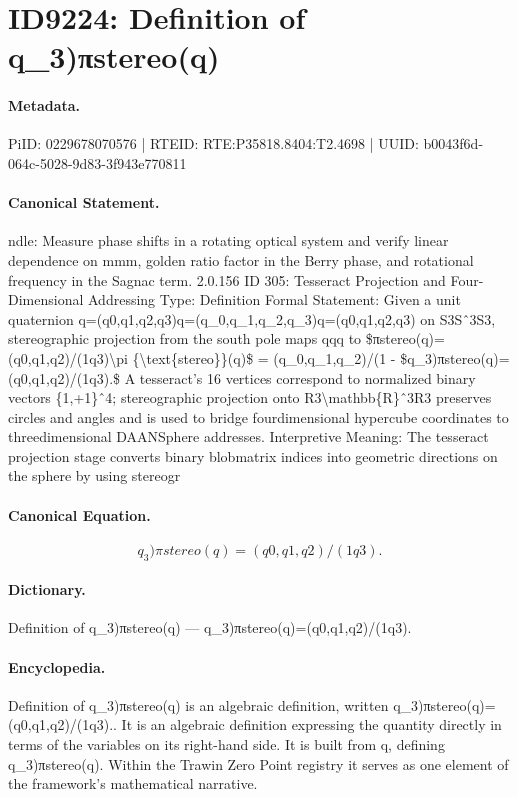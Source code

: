 \section*{ID9224: Definition of q\_3)πstereo(q)}
\paragraph{Metadata.}
PiID: 0229678070576 | RTEID: RTE:P35818.8404:T2.4698 | UUID: b0043f6d-064c-5028-9d83-3f943e770811

\paragraph{Canonical Statement.}
ndle: Measure phase shifts in a rotating optical system and verify linear dependence on mmm, golden ratio factor in the Berry phase, and rotational frequency in the Sagnac term. 2.0.156 ID 305: Tesseract Projection and Four-Dimensional Addressing Type: Definition Formal Statement: Given a unit quaternion q=(q0,q1,q2,q3)q=(q\_0,q\_1,q\_2,q\_3)q=(q0,q1,q2,q3) on S3Sˆ3S3, stereographic projection from the south pole maps qqq to \$πstereo(q)=(q0,q1,q2)/(1q3)\textbackslash{}pi \{\textbackslash{}text\{stereo\}\}(q)\$ = (q\_0,q\_1,q\_2)/(1 - \$q\_3)πstereo(q)=(q0,q1,q2)/(1q3).\$ A tesseract’s 16 vertices correspond to normalized binary vectors \{1,+1\}ˆ4; stereographic projection onto R3\textbackslash{}mathbb\{R\}ˆ3R3 preserves circles and angles and is used to bridge fourdimensional hypercube coordinates to threedimensional DAANSphere addresses. Interpretive Meaning: The tesseract projection stage converts binary blobmatrix indices into geometric directions on the sphere by using stereogr

\paragraph{Canonical Equation.}
\[
q_3)πstereo(q)=(q0,q1,q2)/(1q3).
\]

\paragraph{Dictionary.}
Definition of q\_3)πstereo(q) — q\_3)πstereo(q)=(q0,q1,q2)/(1q3).

\paragraph{Encyclopedia.}
Definition of q\_3)πstereo(q) is an algebraic definition, written q\_3)πstereo(q)=(q0,q1,q2)/(1q3).. It is an algebraic definition expressing the quantity directly in terms of the variables on its right-hand side. It is built from q, defining q\_3)πstereo(q). Within the Trawin Zero Point registry it serves as one element of the framework's mathematical narrative.
